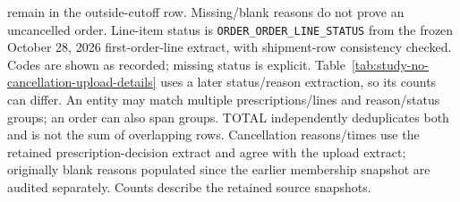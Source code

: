 \begin{table}[!htbp]
\begin{minipage}{\linewidth}
remain in the outside-cutoff row. Missing/blank reasons do not prove an uncancelled
order. Line-item status is \texttt{ORDER\_ORDER\_LINE\_STATUS} from the frozen
October 28, 2026 first-order-line extract, with shipment-row consistency checked.
Codes are shown as recorded; missing status is explicit. Table~\ref{tab:study-no-cancellation-upload-details}
uses a later status/reason extraction, so its counts can differ.
An entity may match multiple prescriptions/lines and reason/status groups;
an order can also span groups. TOTAL independently deduplicates both and is not
the sum of overlapping rows. Cancellation reasons/times use the retained
prescription-decision extract and agree with the upload extract; originally blank
reasons populated since the earlier membership snapshot are audited separately.
Counts describe the retained source snapshots.
\end{minipage}
\end{table}

